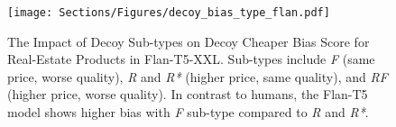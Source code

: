 \begin{figure}[t!]

\centering
\texttt{[image: Sections/Figures/decoy\_bias\_type\_flan.pdf]}

\caption{The Impact of Decoy Sub-types on Decoy Cheaper Bias Score for Real-Estate Products in Flan-T5-XXL. Sub-types include \textit{F} (same price, worse quality), \textit{R} and \textit{R*} (higher price, same quality), and \textit{RF} (higher price, worse quality). In contrast to humans, the Flan-T5 model shows higher bias with \textit{F} sub-type compared to \textit{R} and \textit{R*}.}
\label{fig:decoy_type_flan}

\end{figure}
